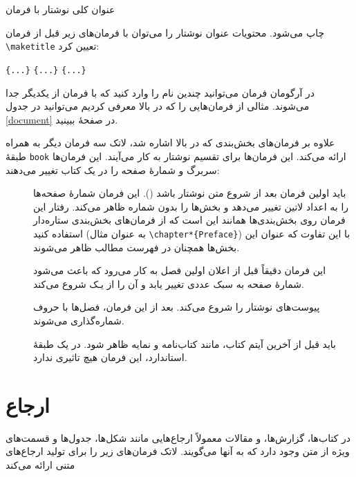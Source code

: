 عنوان کلی نوشتار با فرمان 
\begin{lscommand}
\end{lscommand}
\noindent
چاپ می‌شود. محتویات عنوان نوشتار را می‌توان با فرمان‌های زیر قبل از فرمان 
\verb|\maketitle|
تعیین کرد:
\begin{lscommand}
\verb|{...}|\lr{,} \verb|{...}| 
\lr{,} \verb|{...}| 
\end{lscommand}
\noindent
در آرگومان فرمان 
می‌توانید چندین نام را وارد کنید که با فرمان 
از یکدیگر جدا می‌شوند. مثالی از فرمان‌هایی را که در بالا معرفی کردیم می‌توانید در جدول 
\ref{document}
در صفحهٔ
\pageref{document}
ببینید.

علاوه بر فرمان‌های بخش‌بندی که در بالا اشاره شد، لاتک سه فرمان دیگر به همراه طبقهٔ 
\verb|book|
ارائه می‌کند. این فرمان‌ها برای تقسیم نوشتار به کار می‌آیند. این فرمان‌ها سربرگ و شمارهٔ صفحه را در یک کتاب تغییر می‌دهند:
\begin{description}
\item[] 
باید اولین فرمان بعد از شروع متن نوشتار باشد 
(\verb||). 
این فرمان شمارهٔ صفحه‌ها را به اعداد لاتین تغییر می‌دهد و بخش‌ها را بدون شماره ظاهر می‌کند. رفتار این فرمان روی بخش‌بندی‌ها همانند این است که از فرمان‌های بخش‌بندی ستاره‌دار استفاده کنید (به عنوان مثال 
\verb|\chapter*{Preface}|)
با این تفاوت که عنوان این بخش‌ها همچنان در فهرست مطالب ظاهر می‌شوند.
\item[] 
این فرمان دقیقاً قبل از اعلان اولین فصل به کار می‌رود که باعث می‌شود شمارهٔ صفحه به سبک عددی تغییر یابد و آن را از یـک شروع می‌کند.
\item[] 
پیوست‌های نوشتار را شروع می‌کند. بعد از این فرمان، فصل‌ها با حروف شماره‌\-گذاری می‌شوند.
\item[] 
باید قبل از آخرین آیتم کتاب، مانند کتاب‌نامه و نمایه ظاهر شود. در یک طبقهٔ استاندارد، این فرمان هیچ تاثیری ندارد.
\end{description}

\section{ارجاع}
در کتاب‌ها، گزارش‌ها، و مقالات معمولاً ارجاع‌هایی مانند شکل‌ها، جدول‌ها و قسمت‌های ویژه از متن وجود دارد که به آنها 
می‌گویند. لاتک فرمان‌های زیر را برای تولید ارجاع‌های متنی ارائه می‌کند

